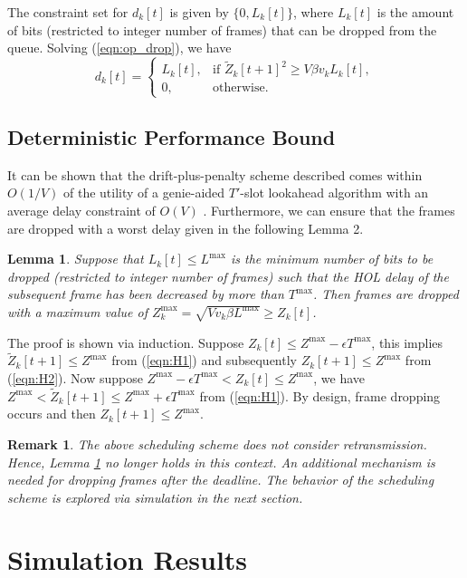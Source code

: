 \documentclass[conference]{IEEEtran}
\newcommand{\0}{\vect{0}}
\newcommand{\1}{\vect{1}}
\newcommand{\eref}[1]{(\ref{#1})}
\newtheorem{lem}{Lemma}
\newtheorem{rem}{Remark}
\def \beq {\begin{equation} }
\def \eeq {\end{equation} }
\begin{document}
The constraint set for $d_k[t]$ is given by $\{0,L_k[t]\}$, where $L_k[t]$ is the amount of bits (restricted to integer number of frames) that can be dropped from the queue. Solving \eref{eqn:op_drop}, we have
\beq
d_k[t] =
\begin{cases}
L_k[t], & \textrm{if $\widetilde{Z}_k[t+1]^2 \ge V\beta v_kL_k[t]$},\\
0, & \textrm{otherwise}.
\end{cases}
\eeq


\subsection{Deterministic Performance Bound}

It can be shown that the drift-plus-penalty scheme described comes within $O(1/V )$ of the utility of a genie-aided $T'$-slot lookahead algorithm with an average delay constraint of $O(V )$ \cite{Nee10Arx}. Furthermore, we can ensure that the frames are dropped with a worst delay given in the following Lemma 2.
\begin{lem} \label{lem:delay}
Suppose that $L_k[t] \le L^{\max}$  is the minimum number of bits to be dropped (restricted to integer number of frames) such that the HOL delay of the subsequent frame has been decreased by more than $T^{\max}$. Then frames are dropped with a maximum value of $Z_k^{\max} = \sqrt{Vv_k\beta L^{\max}} \ge Z_k[t]$.
\end{lem}
\begin{IEEEproof}
The proof is shown via induction. Suppose $Z_k[t] \le Z^{\max} - \epsilon T^{\max}$, this implies $\widetilde{Z}_k[t+1] \le  Z^{\max}$ from \eref{eqn:H1} and subsequently $Z_k[t+1] \le  Z^{\max}$ from \eref{eqn:H2}. Now suppose $Z^{\max} - \epsilon T^{\max} < Z_k[t] \le Z^{\max}$, we have $ Z^{\max}  < \widetilde{Z}_k[t+1] \le  Z^{\max} + \epsilon T^{\max}$  from \eref{eqn:H1}. By design, frame dropping occurs and then $Z_k[t+1] \le  Z^{\max}$.
\end{IEEEproof}


\begin{rem}
The above scheduling scheme does not consider retransmission. Hence, Lemma \ref{lem:delay} no longer holds in this context. An additional mechanism is needed for dropping frames after the deadline. The behavior of the scheduling scheme is explored via simulation in the next section.
\end{rem}

\section{Simulation Results}\label{sec:sim}
\end{document}
